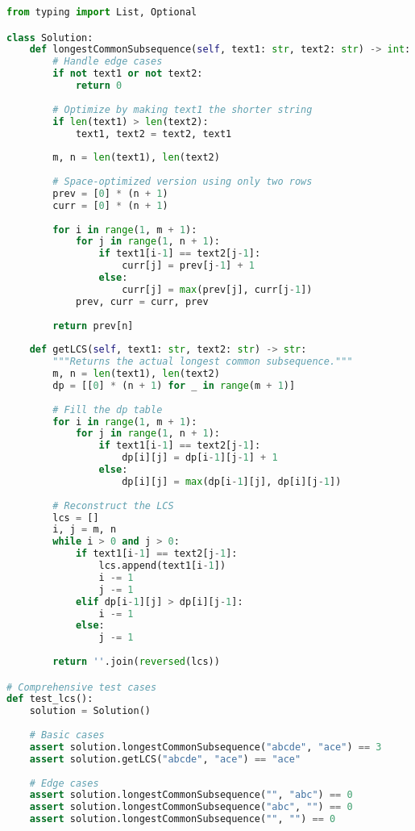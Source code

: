 \begin{fullwidth}
\begin{lstlisting}[language=Python]
from typing import List, Optional

class Solution:
    def longestCommonSubsequence(self, text1: str, text2: str) -> int:
        # Handle edge cases
        if not text1 or not text2:
            return 0
            
        # Optimize by making text1 the shorter string
        if len(text1) > len(text2):
            text1, text2 = text2, text1
            
        m, n = len(text1), len(text2)
        
        # Space-optimized version using only two rows
        prev = [0] * (n + 1)
        curr = [0] * (n + 1)
        
        for i in range(1, m + 1):
            for j in range(1, n + 1):
                if text1[i-1] == text2[j-1]:
                    curr[j] = prev[j-1] + 1
                else:
                    curr[j] = max(prev[j], curr[j-1])
            prev, curr = curr, prev
            
        return prev[n]
    
    def getLCS(self, text1: str, text2: str) -> str:
        """Returns the actual longest common subsequence."""
        m, n = len(text1), len(text2)
        dp = [[0] * (n + 1) for _ in range(m + 1)]
        
        # Fill the dp table
        for i in range(1, m + 1):
            for j in range(1, n + 1):
                if text1[i-1] == text2[j-1]:
                    dp[i][j] = dp[i-1][j-1] + 1
                else:
                    dp[i][j] = max(dp[i-1][j], dp[i][j-1])
        
        # Reconstruct the LCS
        lcs = []
        i, j = m, n
        while i > 0 and j > 0:
            if text1[i-1] == text2[j-1]:
                lcs.append(text1[i-1])
                i -= 1
                j -= 1
            elif dp[i-1][j] > dp[i][j-1]:
                i -= 1
            else:
                j -= 1
                
        return ''.join(reversed(lcs))

# Comprehensive test cases
def test_lcs():
    solution = Solution()
    
    # Basic cases
    assert solution.longestCommonSubsequence("abcde", "ace") == 3
    assert solution.getLCS("abcde", "ace") == "ace"
    
    # Edge cases
    assert solution.longestCommonSubsequence("", "abc") == 0
    assert solution.longestCommonSubsequence("abc", "") == 0
    assert solution.longestCommonSubsequence("", "") == 0
    

\end{lstlisting}
\end{fullwidth}
